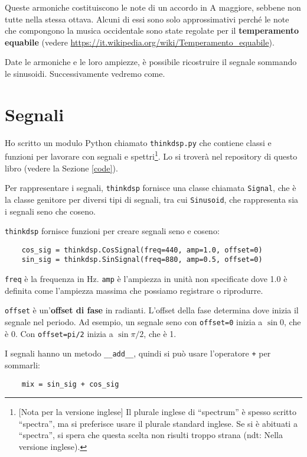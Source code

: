 \documentclass[12pt]{book} \usepackage[width=5.5in,height=8.5in, hmarginratio=3:2,vmarginratio=1:1]{geometry}
\begin{document}
Queste armoniche costituiscono le note di un accordo in A maggiore, sebbene non tutte nella stessa ottava. Alcuni di essi sono solo approssimativi perché le note che compongono la musica occidentale sono state regolate per il {\bf temperamento equabile} (vedere \url{https://it.wikipedia.org/wiki/Temperamento_equabile}).

Date le armoniche e le loro ampiezze, è possibile ricostruire il segnale sommando le sinusoidi. Successivamente vedremo come.

\section{Segnali} 

Ho scritto un modulo Python chiamato {\tt thinkdsp.py} che contiene classi e funzioni per lavorare con segnali e spettri\footnote{[Nota per la versione inglese] Il plurale inglese di ``spectrum'' è spesso scritto ``spectra'', ma si preferisce usare il plurale standard inglese. Se si è abituati a ``spectra'', si spera che questa scelta non risulti troppo strana (ndt: Nella versione inglese).}. Lo si troverà nel repository di questo libro (vedere la Sezione \ref{code}).

Per rappresentare i segnali, {\tt thinkdsp} fornisce una classe chiamata {\tt Signal}, che è la classe genitore per diversi tipi di segnali, tra cui {\tt Sinusoid}, che rappresenta sia i segnali seno che coseno.

{\tt thinkdsp} fornisce funzioni per creare segnali seno e coseno:

\begin{verbatim} 
    cos_sig = thinkdsp.CosSignal(freq=440, amp=1.0, offset=0)
    sin_sig = thinkdsp.SinSignal(freq=880, amp=0.5, offset=0)
 \end{verbatim} 

{\tt freq} è la frequenza in Hz. {\tt amp} è l'ampiezza in unità non specificate dove 1.0 è definita come l'ampiezza massima che possiamo registrare o riprodurre.

{\tt offset} è un'{\bf offset di fase} in radianti. L'offset della fase determina dove inizia il segnale nel periodo. Ad esempio, un segnale seno con {\tt offset=0} inizia a $\sin 0$, che è 0. Con {\tt offset=pi/2} inizia a $\sin \pi/2$, che è 1.

I segnali hanno un metodo \verb"__add__", quindi si può usare l'operatore {\tt +} per sommarli:

\begin{verbatim} 
    mix = sin_sig + cos_sig
 \end{verbatim} 
\end{document}
